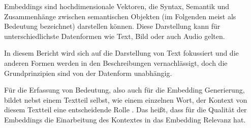 \documentclass[../main.tex]{subfiles}
\begin{document}
Embeddings sind hochdimensionale Vektoren, die Syntax, Semantik und Zusammenhänge zwischen semantischen Objekten (im Folgenden meist als Bedeutung bezeichnet) darstellen können.
Diese Darstellung kann für unterschiedlichste Datenformen wie Text, Bild oder auch Audio gelten.
\cite{mikolov2013efficient}

In diesem Bericht wird sich auf die Darstellung von Text fokussiert und die anderen Formen werden in den Beschreibungen vernachlässigt, doch die Grundprinzipien sind von der Datenform unabhängig.

Für die Erfassung von Bedeutung, also auch für die Embedding Generierung, bildet nebst einem Textteil selbst, wie einem einzelnen Wort, der Kontext von diesem Textteil eine entscheidende Rolle \cite{rubenstein1965contextual}.
Das heißt, dass für die Qualität der Embeddings die Einarbeitung des Kontextes in das Embedding Relevanz hat.
\cite{huang-etal-2012-improving}
\end{document}
